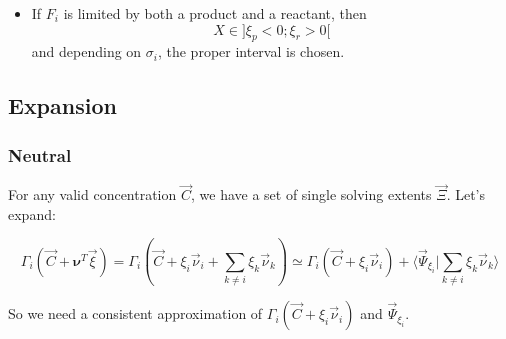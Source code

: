 \documentclass[aps,12pt]{revtex4}
\begin{document}
\begin{itemize}
\begin{itemize}
	\item If $F_i$ is limited by both a product and a reactant, then $$X\in\rbrack \xi_p < 0 ; \xi_r > 0 \lbrack$$
	and depending on $\sigma_i$, the proper interval is chosen.
	\end{itemize}
	
\end{itemize}

\subsection{Expansion}
\subsubsection{Neutral}
 
For any valid concentration $\vec{C}$, we have a set of single solving extents $\vec{\Xi}$.
Let's expand:

\begin{equation}
\Gamma_i(\vec{C} + \bm{\nu}^T \vec{\xi}) =  \Gamma_i(\vec{C} + \xi_i \vec{\nu}_i + \sum_{k\not=i} \xi_k \vec{\nu}_k)
\simeq \Gamma_i(\vec{C} + \xi_i \vec{\nu}_i) + \langle \vec{\Psi}_{\xi_i} \vert \sum_{k\not=i} \xi_k \vec{\nu}_k \rangle
\end{equation}

So we need a consistent approximation of $\Gamma_i(\vec{C} + \xi_i \vec{\nu}_i)$ and $\vec{\Psi}_{\xi_i}$.
\end{document}
